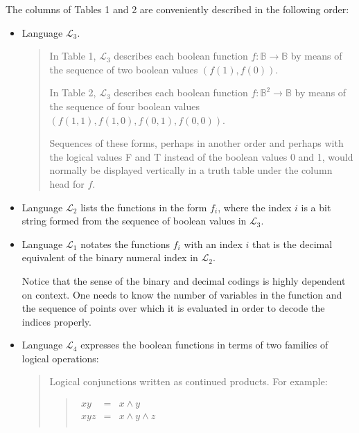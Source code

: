 \documentclass[12pt]{article}
\begin{document}
The columns of Tables 1 and 2 are conveniently described in the following order:

\begin{itemize}

\item
Language $\mathcal{L}_3$.

\begin{quote}
In Table 1, $\mathcal{L}_3$ describes each boolean function $f : \mathbb{B} \to \mathbb{B}$ by means of the sequence of two boolean values $(f(1), f(0))$.

In Table 2, $\mathcal{L}_3$ describes each boolean function $f : \mathbb{B}^2 \to \mathbb{B}$ by means of the sequence of four boolean values $(f(1, 1), f(1, 0), f(0, 1), f(0, 0))$.

Sequences of these forms, perhaps in another order and perhaps with the logical values F and T instead of the boolean values 0 and 1, would normally be displayed vertically in a truth table under the column head for $f$.
\end{quote}

\item
Language $\mathcal{L}_2$ lists the functions in the form $f_i$, where the index $i$ is a bit string formed from the sequence of boolean values in $\mathcal{L}_3$.

\item
Language $\mathcal{L}_1$ notates the functions $f_i$ with an index $i$ that is the decimal equivalent of the binary numeral index in $\mathcal{L}_2$.

Notice that the sense of the binary and decimal codings is highly dependent on context.  One needs to know the number of variables in the function and the sequence of points over which it is evaluated in order to decode the indices properly.

\item
Language $\mathcal{L}_4$ expresses the boolean functions in terms of two families of logical operations:

\begin{quote}
Logical conjunctions written as continued products.  For example:

\begin{quote}$\begin{array}{ccc}
x y   & = & x \land y         \\
x y z & = & x \land y \land z \\
\end{array}$\end{quote}


\end{quote}
\end{itemize}
\end{document}
